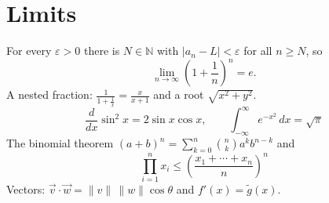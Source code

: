 \documentclass{article}
\begin{document}
\section{Limits}
For every $\varepsilon>0$ there is $N\in\mathbb{N}$ with $|a_n-L|<\varepsilon$ for all $n\ge N$, so
\begin{equation}
\lim_{n\to\infty}\left(1+\frac{1}{n}\right)^{n}=e .
\end{equation}
A nested fraction: $\frac{1}{1+\frac{1}{x}}=\frac{x}{x+1}$ and a root $\sqrt{x^2+y^2}$.
\[
\frac{d}{dx}\sin^2 x = 2\sin x\cos x, \qquad \int_{-\infty}^{\infty} e^{-x^2}\,dx=\sqrt{\pi}
\]
The binomial theorem $(a+b)^n=\sum_{k=0}^{n}\binom{n}{k}a^k b^{n-k}$ and
\[
\prod_{i=1}^{n} x_i \le \left(\frac{x_1+\cdots+x_n}{n}\right)^{n}
\]
Vectors: $\vec{v}\cdot\vec{w}=\|v\|\,\|w\|\cos\theta$ and $f'(x)=\tilde{g}(x)$.
\end{document}
